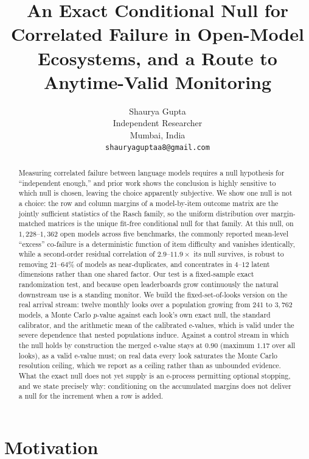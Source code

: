 \documentclass{article}
\title{An Exact Conditional Null for Correlated Failure in Open-Model Ecosystems, and a Route to Anytime-Valid Monitoring}
\author{
  Shaurya Gupta \\
  Independent Researcher \\
  Mumbai, India \\
  \texttt{shauryaguptaa8@gmail.com}
}
\begin{document}
\maketitle

\begin{abstract}
Measuring correlated failure between language models requires a null hypothesis for
``independent enough,'' and prior work shows the conclusion is highly sensitive to which null is
chosen, leaving the choice apparently subjective. We show one null is not a choice: the row and
column margins of a model-by-item outcome matrix are the jointly sufficient statistics of the
Rasch family, so the uniform distribution over margin-matched matrices is the unique fit-free
conditional null for that family. At this null, on $1{,}228$--$1{,}362$ open models across five
benchmarks, the commonly reported mean-level ``excess'' co-failure is a deterministic function of
item difficulty and vanishes identically, while a second-order residual correlation of
$2.9$--$11.9\times$ its null survives, is robust to removing $21$--$64\%$ of models as
near-duplicates, and concentrates in $4$--$12$ latent dimensions rather than one shared factor.
Our test is a fixed-sample exact randomization test, and because open leaderboards grow
continuously the natural downstream use is a standing monitor. We build the fixed-set-of-looks
version on the real arrival stream: twelve monthly looks over a population growing from $241$ to
$3{,}762$ models, a Monte Carlo $p$-value against each look's own exact null, the standard
calibrator, and the arithmetic mean of the calibrated e-values, which is valid under the severe
dependence that nested populations induce. Against a control stream in which the null holds by
construction the merged e-value stays at $0.90$ (maximum $1.17$ over all looks), as a valid
e-value must; on real data every look saturates the Monte Carlo resolution ceiling, which we
report as a ceiling rather than as unbounded evidence. What the exact null does not yet supply is
an e-process permitting optional stopping, and we state precisely why: conditioning on the
accumulated margins does not deliver a null for the increment when a row is added.
\end{abstract}

\section{Motivation}
\end{document}
